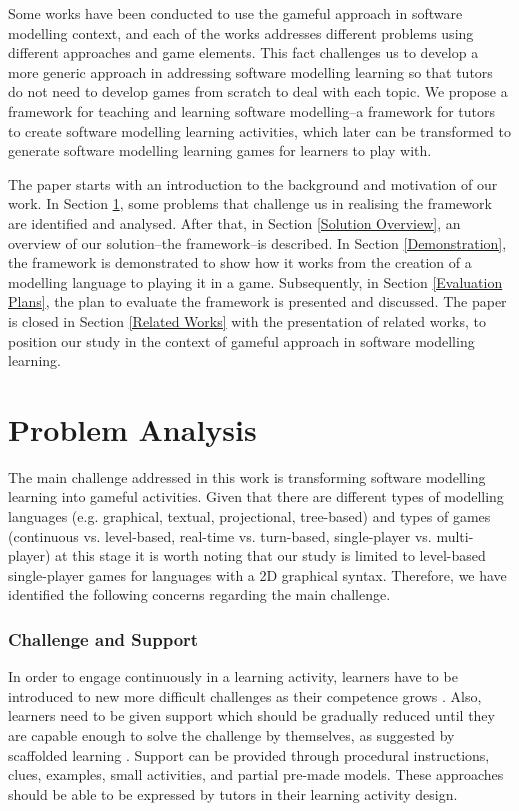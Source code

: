 \documentclass[conference]{IEEEtran}
\begin{document}
Some works \cite{Stikkolorum2014, Groenewegen2010, Ionita2015, Richardsen2014} have been conducted to use the gameful approach in software modelling context, and each of the works addresses different problems using different approaches and game elements. This fact challenges us to develop a more generic approach in addressing software modelling learning so that tutors do not need to develop games from scratch to deal with each topic. We propose a framework for teaching and learning software modelling--a framework for tutors to create software modelling learning activities, which later can be transformed to generate software modelling learning games for learners to play with.

The paper starts with an introduction to the background and motivation of our work. In Section \ref{Problem Analysis}, some problems that challenge us in realising the framework are identified and analysed. After that, in Section \ref{Solution Overview}, an overview of our solution--the framework--is described. In Section \ref{Demonstration}, the framework is demonstrated to show how it works from the creation of a modelling language to playing it in a game. Subsequently, in Section \ref{Evaluation Plans}, the plan to evaluate the framework is presented and discussed. The paper is closed in Section \ref{Related Works} with the presentation of related works, to position our study in the context of gameful approach in software modelling learning. 

\section{Problem Analysis}
\label{Problem Analysis}
The main challenge addressed in this work is transforming software modelling learning into gameful activities. Given that there are different types of modelling languages (e.g. graphical, textual, projectional, tree-based) and types of games (continuous vs. level-based, real-time vs. turn-based, single-player vs. multi-player) at this stage it is worth noting that our study is limited to level-based single-player games for languages with a 2D graphical syntax. Therefore, we have identified the following concerns regarding the main challenge.

\subsubsection{Challenge and Support}
\label{Challenge and Support}
In order to engage continuously in a learning activity, learners have to be introduced to new more difficult challenges as their competence grows \cite{csikszentmihalyi2014toward}. Also, learners need to be given support which should be gradually reduced until they are capable enough to solve the challenge by themselves, as suggested by scaffolded learning \cite{wood1976role, vygotsky1978mind}. Support can be provided through procedural instructions, clues, examples, small activities, and partial pre-made models. These approaches should be able to be expressed by tutors in their learning activity design. 
\end{document}
